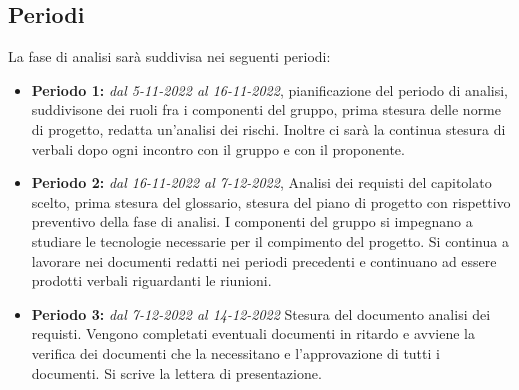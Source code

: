 \subsection{Periodi}
La fase di analisi sarà suddivisa nei seguenti periodi:
\begin{itemize}
\item \textbf{Periodo 1:} \textit{dal 5-11-2022 al 16-11-2022},  pianificazione del periodo di analisi,  suddivisone dei ruoli fra i componenti del gruppo,  prima stesura delle norme di progetto, redatta un'analisi dei rischi. Inoltre ci sarà la continua stesura di verbali dopo ogni incontro con il gruppo e con il proponente.
\item \textbf{Periodo 2:} \textit{dal 16-11-2022 al 7-12-2022},  Analisi dei requisti del capitolato scelto,  prima stesura del glossario, stesura del piano di progetto con rispettivo preventivo della fase di analisi.  I componenti del gruppo si impegnano a studiare le tecnologie necessarie per il compimento del progetto. Si continua a lavorare nei documenti redatti nei periodi precedenti e continuano ad essere prodotti verbali riguardanti le riunioni.
\item \textbf{Periodo 3: } \textit{dal 7-12-2022 al 14-12-2022} Stesura del documento analisi dei requisti. Vengono completati eventuali documenti in ritardo e avviene la verifica dei documenti che la necessitano e l'approvazione di tutti i documenti.  Si scrive la lettera di presentazione.
\end{itemize}

